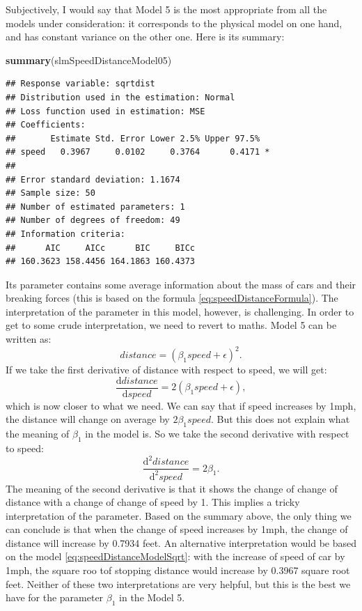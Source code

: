 \documentclass[
]{book}
\newenvironment{Shaded}{\begin{snugshade}}{\end{snugshade}}
\newcommand{\FunctionTok}[1]{\textcolor[rgb]{0.13,0.29,0.53}{\textbf{#1}}}
\newcommand{\NormalTok}[1]{#1}
\theoremstyle{definition}
\theoremstyle{definition}
\theoremstyle{definition}
\theoremstyle{definition}
\theoremstyle{remark}
\begin{document}
Subjectively, I would say that Model 5 is the most appropriate from all the models under consideration: it corresponds to the physical model on one hand, and has constant variance on the other one. Here is its summary:

\begin{Shaded}
\begin{Highlighting}[]
\FunctionTok{summary}\NormalTok{(slmSpeedDistanceModel05)}
\end{Highlighting}
\end{Shaded}

\begin{verbatim}
## Response variable: sqrtdist
## Distribution used in the estimation: Normal
## Loss function used in estimation: MSE
## Coefficients:
##       Estimate Std. Error Lower 2.5% Upper 97.5%  
## speed   0.3967     0.0102     0.3764      0.4171 *
## 
## Error standard deviation: 1.1674
## Sample size: 50
## Number of estimated parameters: 1
## Number of degrees of freedom: 49
## Information criteria:
##      AIC     AICc      BIC     BICc 
## 160.3623 158.4456 164.1863 160.4373
\end{verbatim}

Its parameter contains some average information about the mass of cars and their breaking forces (this is based on the formula \eqref{eq:speedDistanceFormula}). The interpretation of the parameter in this model, however, is challenging. In order to get to some crude interpretation, we need to revert to maths. Model 5 can be written as:
\begin{equation}
    distance = (\beta_1 speed + \epsilon)^2 .
    \label{eq:speedDistanceModelSqrt3}
\end{equation}
If we take the first derivative of distance with respect to speed, we will get:
\begin{equation}
    \frac{\mathrm{d}distance}{\mathrm{d}speed} = 2 (\beta_1 speed + \epsilon) ,
    \label{eq:speedDistanceModelSqrt4}
\end{equation}
which is now closer to what we need. We can say that if speed increases by 1mph, the distance will change on average by \(2 \beta_1 speed\). But this does not explain what the meaning of \(\beta_1\) in the model is. So we take the second derivative with respect to speed:
\begin{equation}
    \frac{\mathrm{d}^2 distance}{\mathrm{d}^2 speed} = 2 \beta_1 .
    \label{eq:speedDistanceModelSqrt5}
\end{equation}
The meaning of the second derivative is that it shows the change of change of distance with a change of change of speed by 1. This implies a tricky interpretation of the parameter. Based on the summary above, the only thing we can conclude is that when the change of speed increases by 1mph, the change of distance will increase by 0.7934 feet. An alternative interpretation would be based on the model \eqref{eq:speedDistanceModelSqrt}: with the increase of speed of car by 1mph, the square roo tof stopping distance would increase by 0.3967 square root feet. Neither of these two interpretations are very helpful, but this is the best we have for the parameter \(\beta_1\) in the Model 5.
\end{document}
